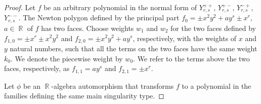 \documentclass[noend]{amsproc}
\theoremstyle{definition}
\DeclareMathOperator{\R}{\mathbb{R}}
\begin{document}
\begin{proof}
Let $f$ be an arbitrary polynomial in the normal form of $Y_{r,s}^{++}$, $Y_{r,s}^{+-}$, $Y_{r,s}^{-+}$, $Y_{r,s}^{--}$. The Newton polygon defined by the principal part $f_0=\pm x^2y^2+ay^s\pm x^r$, $a\in\R$ of $f$ has two faces. Choose weights $w_1$ and $w_2$ for the two faces defined by $f_{1,0}=\pm x^r\pm x^2y^2$ and $f_{2,0}=\pm x^2y^2+ay^s$, respectively, with the weights of $x$ and $y$ natural numbers, such that all the terms on the two faces have the same weight $k_0$. We denote the piecewise weight by $w_0$. We refer to the terms above the two faces, respectively, as $f_{1,1}=ay^s$ and $f_{2,1}=\pm x^r$.

Let $\phi$ be an $\R$-algebra automorphism that transforms $f$ to a polynomial in the families defining the same main singularity type. 


\end{proof}
\end{document}
